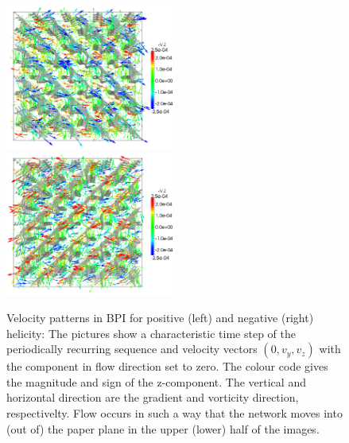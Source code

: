 \documentclass[aps,pre,onecolumn,groupedaddress]{revtex4-1}
\begin{document}
\begin{figure}[h]
\includegraphics[width=0.495\textwidth]{v_yz-v_z-360k_run914.png}
\includegraphics[width=0.495\textwidth]{v_yz-v_z-360k_run922.png}
\caption{Velocity patterns in BPI for positive (left) and negative (right) helicity: The pictures show a characteristic time step of the periodically recurring sequence and velocity vectors $(0,v_y,v_z)$ with the component in flow direction set to zero. The colour code gives the magnitude and sign of the z-component. The vertical and horizontal direction are the gradient and vorticity direction, respectivelty. Flow occurs in such a way that the network moves into (out of) the paper plane in the upper (lower) half of the images.}
\label{bp1-velo}
\end{figure}
\end{document}
